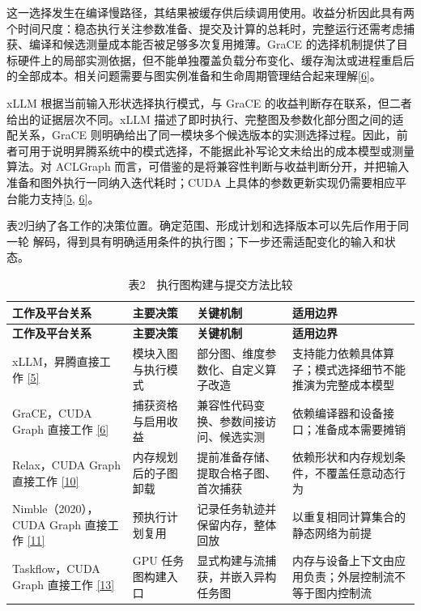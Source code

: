 \documentclass[UTF8,11pt,fontset=windows]{ctexart}
\begin{document}
这一选择发生在编译慢路径，其结果被缓存供后续调用使用。收益分析因此具有两个时间尺度：稳态执行关注参数准备、提交及计算的总耗时，完整运行还需考虑捕获、编译和候选测量成本能否被足够多次复用摊薄。GraCE 的选择机制提供了目标硬件上的局部实测依据，但不能单独覆盖负载分布变化、缓存淘汰或进程重启后的全部成本。相关问题需要与图实例准备和生命周期管理结合起来理解\protect\hyperlink{ref-6}{{[}6{]}}。

xLLM 根据当前输入形状选择执行模式，与 GraCE 的收益判断存在联系，但二者给出的证据层次不同。xLLM 描述了即时执行、完整图及参数化部分图之间的适配关系，GraCE 则明确给出了同一模块多个候选版本的实测选择过程。因此，前者可用于说明昇腾系统中的模式选择，不能据此补写论文未给出的成本模型或测量算法。对 ACLGraph 而言，可借鉴的是将兼容性判断与收益判断分开，并把输入准备和图外执行一同纳入迭代耗时；CUDA 上具体的参数更新实现仍需要相应平台能力支持\protect\hyperlink{ref-5}{{[}5}, \protect\hyperlink{ref-6}{6{]}}。

表2归纳了各工作的决策位置。确定范围、形成计划和选择版本可以先后作用于同一轮 解码，得到具有明确适用条件的执行图；下一步还需适配变化的输入和状态。

\begingroup\small
\begin{longtable}[]{@{}>{\raggedright\arraybackslash}p{}>{\raggedright\arraybackslash}p{}>{\raggedright\arraybackslash}p{}>{\raggedright\arraybackslash}p{}@{}}
\caption{表2　执行图构建与提交方法比较}\tabularnewline
\toprule
\textbf{工作及平台关系} & \textbf{主要决策} & \textbf{关键机制} & \textbf{适用边界} \\
\midrule
\endfirsthead
\toprule
\textbf{工作及平台关系} & \textbf{主要决策} & \textbf{关键机制} & \textbf{适用边界} \\
\midrule
\endhead
xLLM，昇腾直接工作 \protect\hyperlink{ref-5}{{[}5{]}} & 模块入图与执行模式 & 部分图、维度参数化、自定义算子改造 & 支持能力依赖具体算子；模式选择细节不能推演为完整成本模型 \\
GraCE，CUDA Graph 直接工作 \protect\hyperlink{ref-6}{{[}6{]}} & 捕获资格与启用收益 & 兼容性代码变换、参数间接访问、候选实测 & 依赖编译器和设备接口；准备成本需要摊销 \\
Relax，CUDA Graph 直接工作 \protect\hyperlink{ref-10}{{[}10{]}} & 内存规划后的子图卸载 & 提前准备存储、提取合格子图、首次捕获 & 依赖形状和内存规划条件，不覆盖任意动态行为 \\
Nimble（2020），CUDA Graph 直接工作 \protect\hyperlink{ref-11}{{[}11{]}} & 预执行计划复用 & 记录任务轨迹并保留内存，整体回放 & 以重复相同计算集合的静态网络为前提 \\
Taskflow，CUDA Graph 直接工作 \protect\hyperlink{ref-13}{{[}13{]}} & GPU 任务图构建入口 & 显式构建与流捕获，并嵌入异构任务图 & 内存与设备上下文由应用负责；外层控制流不等于图内控制流 \\
\bottomrule
\end{longtable}
\endgroup
\end{document}
